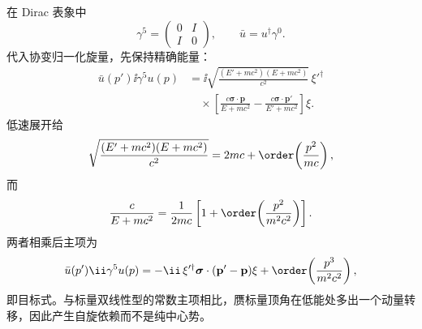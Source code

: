\begin{exbox}[赝标量耦合的低能自旋结构]
在 Dirac 表象中
\begin{equation*}
 \gamma^5=
 \begin{pmatrix}0&I\\ I&0\end{pmatrix},
 \qquad
 \bar u=u^\dagger\gamma^0.
\end{equation*}
代入协变归一化旋量，先保持精确能量：
\begin{align*}
 \bar u(p')\ii\gamma^5u(p)
 &=\ii\sqrt{\frac{(E'+mc^2)(E+mc^2)}{c^2}}\,
 \xi'^\dagger\\
 &\quad\times\left[
 \frac{c\boldsymbol\sigma\cdot\mathbf p}{E+mc^2}
 -\frac{c\boldsymbol\sigma\cdot\mathbf p'}{E'+mc^2}
 \right]\xi.
\end{align*}
低速展开给
\begin{equation*}
 \sqrt{\frac{(E'+mc^2)(E+mc^2)}{c^2}}
 =2mc+\order\!\left(\frac{p^2}{mc}\right),
\end{equation*}
而
\begin{equation*}
 \frac{c}{E+mc^2}
 =\frac{1}{2mc}\left[1+\order\!\left(\frac{p^2}{m^2c^2}\right)\right].
\end{equation*}
两者相乘后主项为
\begin{equation*}
 \bar u(p')\ii\gamma^5u(p)
 =-\ii\,\xi'^\dagger\boldsymbol\sigma\cdot(\mathbf p'-\mathbf p)\xi
 +\order\!\left(\frac{p^3}{m^2c^2}\right),
\end{equation*}
即目标式。与标量双线性型的常数主项相比，赝标量顶角在低能处多出一个动量转移，因此产生自旋依赖而不是纯中心势。
\end{exbox}
